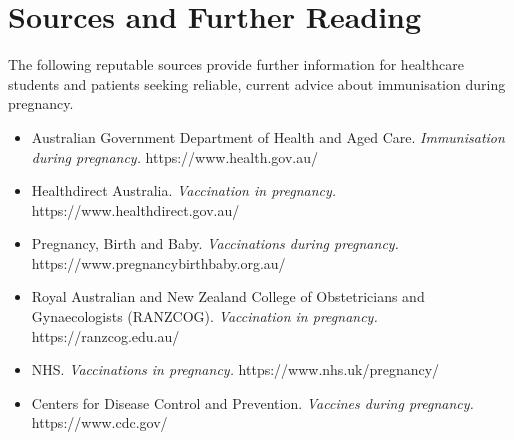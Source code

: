 \section*{Sources and Further Reading}
The following reputable sources provide further information for healthcare students and patients seeking reliable, current advice about immunisation during pregnancy.
\begin{itemize}
    \item Australian Government Department of Health and Aged Care. \textit{Immunisation during pregnancy.} https://www.health.gov.au/
    \item Healthdirect Australia. \textit{Vaccination in pregnancy.} https://www.healthdirect.gov.au/
    \item Pregnancy, Birth and Baby. \textit{Vaccinations during pregnancy.} https://www.pregnancybirthbaby.org.au/
    \item Royal Australian and New Zealand College of Obstetricians and Gynaecologists (RANZCOG). \textit{Vaccination in pregnancy.} https://ranzcog.edu.au/
    \item NHS. \textit{Vaccinations in pregnancy.} https://www.nhs.uk/pregnancy/
    \item Centers for Disease Control and Prevention. \textit{Vaccines during pregnancy.} https://www.cdc.gov/
\end{itemize}
